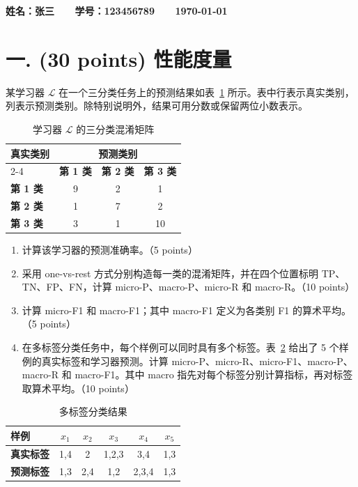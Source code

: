 \documentclass[8pt]{article}
\begin{document}
\textbf{\color{blue} \Large
姓名：张三 \ \ \ 学号：123456789 \ \ \ \today}

\section*{一. (30 points) 性能度量}

某学习器 $\mathcal{L}$ 在一个三分类任务上的预测结果如表~\ref{tab:confusion} 所示。表中行表示真实类别，列表示预测类别。除特别说明外，结果可用分数或保留两位小数表示。

\begin{table}[H]
\centering
\begin{tabular}{lccc}
\toprule
\multirow{2}{*}{\textbf{真实类别}} & \multicolumn{3}{c}{\textbf{预测类别}} \\
\cmidrule(lr){2-4}
 & \textbf{第 1 类} & \textbf{第 2 类} & \textbf{第 3 类} \\
\midrule
\textbf{第 1 类} & 9 & 2 & 1 \\
\textbf{第 2 类} & 1 & 7 & 2 \\
\textbf{第 3 类} & 3 & 1 & 10 \\
\bottomrule
\end{tabular}
\caption{学习器 $\mathcal{L}$ 的三分类混淆矩阵}
\label{tab:confusion}
\end{table}

\begin{enumerate}[leftmargin=2.2em,itemsep=0.45em]
  \item 计算该学习器的预测准确率。（5 points）
  \item 采用 one-vs-rest 方式分别构造每一类的混淆矩阵，并在四个位置标明 TP、TN、FP、FN，计算 micro-P、macro-P、micro-R 和 macro-R。（10 points）
  \item 计算 micro-F1 和 macro-F1；其中 macro-F1 定义为各类别 F1 的算术平均。（5 points）
  \item 在多标签分类任务中，每个样例可以同时具有多个标签。表~\ref{tab:multilabel} 给出了 5 个样例的真实标签和学习器预测。计算 micro-P、micro-R、micro-F1、macro-P、macro-R 和 macro-F1。其中 macro 指先对每个标签分别计算指标，再对标签取算术平均。（10 points）
\end{enumerate}

\begin{table}[H]
\centering
\begin{tabular}{lccccc}
\toprule
\textbf{样例} & $x_1$ & $x_2$ & $x_3$ & $x_4$ & $x_5$ \\
\midrule
\textbf{真实标签} & 1,4 & 2 & 1,2,3 & 3,4 & 1,3 \\
\textbf{预测标签} & 1,3 & 2,4 & 1,2 & 2,3,4 & 1,3 \\
\bottomrule
\end{tabular}
\caption{多标签分类结果}
\label{tab:multilabel}
\end{table}
\end{document}
